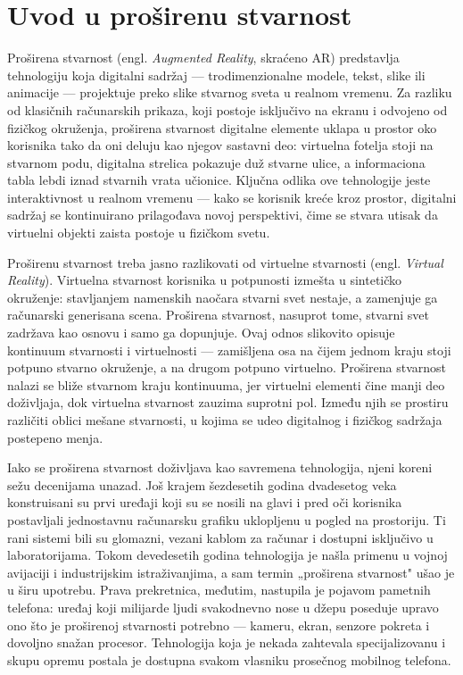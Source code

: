 \section{Uvod u proširenu stvarnost}

Proširena stvarnost (engl. \textit{Augmented Reality}, skraćeno AR) predstavlja tehnologiju koja digitalni sadržaj --- trodimenzionalne modele, tekst, slike ili animacije --- projektuje preko slike stvarnog sveta u realnom vremenu. Za razliku od klasičnih računarskih prikaza, koji postoje isključivo na ekranu i odvojeno od fizičkog okruženja, proširena stvarnost digitalne elemente uklapa u prostor oko korisnika tako da oni deluju kao njegov sastavni deo: virtuelna fotelja stoji na stvarnom podu, digitalna strelica pokazuje duž stvarne ulice, a informaciona tabla lebdi iznad stvarnih vrata učionice. Ključna odlika ove tehnologije jeste interaktivnost u realnom vremenu --- kako se korisnik kreće kroz prostor, digitalni sadržaj se kontinuirano prilagođava novoj perspektivi, čime se stvara utisak da virtuelni objekti zaista postoje u fizičkom svetu.

Proširenu stvarnost treba jasno razlikovati od virtuelne stvarnosti (engl. \textit{Virtual Reality}). Virtuelna stvarnost korisnika u potpunosti izmešta u sintetičko okruženje: stavljanjem namenskih naočara stvarni svet nestaje, a zamenjuje ga računarski generisana scena. Proširena stvarnost, nasuprot tome, stvarni svet zadržava kao osnovu i samo ga dopunjuje. Ovaj odnos slikovito opisuje kontinuum stvarnosti i virtuelnosti --- zamišljena osa na čijem jednom kraju stoji potpuno stvarno okruženje, a na drugom potpuno virtuelno. Proširena stvarnost nalazi se bliže stvarnom kraju kontinuuma, jer virtuelni elementi čine manji deo doživljaja, dok virtuelna stvarnost zauzima suprotni pol. Između njih se prostiru različiti oblici mešane stvarnosti, u kojima se udeo digitalnog i fizičkog sadržaja postepeno menja.

Iako se proširena stvarnost doživljava kao savremena tehnologija, njeni koreni sežu decenijama unazad. Još krajem šezdesetih godina dvadesetog veka konstruisani su prvi uređaji koji su se nosili na glavi i pred oči korisnika postavljali jednostavnu računarsku grafiku uklopljenu u pogled na prostoriju. Ti rani sistemi bili su glomazni, vezani kablom za računar i dostupni isključivo u laboratorijama. Tokom devedesetih godina tehnologija je našla primenu u vojnoj avijaciji i industrijskim istraživanjima, a sam termin „proširena stvarnost" ušao je u širu upotrebu. Prava prekretnica, međutim, nastupila je pojavom pametnih telefona: uređaj koji milijarde ljudi svakodnevno nose u džepu poseduje upravo ono što je proširenoj stvarnosti potrebno --- kameru, ekran, senzore pokreta i dovoljno snažan procesor. Tehnologija koja je nekada zahtevala specijalizovanu i skupu opremu postala je dostupna svakom vlasniku prosečnog mobilnog telefona.

